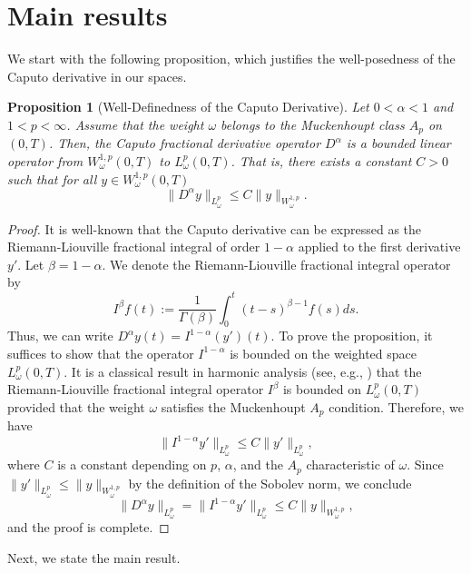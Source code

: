 \documentclass[12pt,a4paper]{article}
\newtheorem{proposition}{Proposition}
\theoremstyle{definition}
\begin{document}
\section{Main results}
We start with the following proposition, which justifies the well-posedness of the Caputo derivative in our spaces. 
\begin{proposition}[Well-Definedness of the Caputo Derivative]
Let $0 < \alpha < 1$ and $1 < p < \infty$. Assume that the weight $\omega$ belongs to the Muckenhoupt class $A_p$ on $(0,T)$. Then, the Caputo fractional derivative operator $D^\alpha$ is a bounded linear operator from $W^{1,p}_\omega(0,T)$ to $L^p_\omega(0,T)$. That is, there exists a constant $C > 0$ such that for all $y \in W^{1,p}_\omega(0,T)$
\begin{equation}
    \| D^\alpha y \|_{L^p_\omega} \leq C \| y \|_{W^{1,p}_\omega}.
\end{equation}
\end{proposition}
\begin{proof}
It is well-known that the Caputo derivative can be expressed as the Riemann-Liouville fractional integral of order $1-\alpha$ applied to the first derivative $y'$. Let $\beta = 1 - \alpha$. We denote the Riemann-Liouville fractional integral operator by 
\begin{equation}
    I^\beta f(t) := \frac{1}{\Gamma(\beta)} \int_0^t (t-s)^{\beta-1} f(s) ds.
\end{equation}
Thus, we can write $D^\alpha y(t) = I^{1-\alpha}(y')(t)$. To prove the proposition, it suffices to show that the operator $I^{1-\alpha}$ is bounded on the weighted space $L^p_\omega(0,T)$. It is a classical result in harmonic analysis (see, e.g., \cite{MuckenhouptWheeden1974}) that the Riemann-Liouville fractional integral operator $I^\beta$ is bounded on $L^p_\omega(0,T)$ provided that the weight $\omega$ satisfies the Muckenhoupt $A_p$ condition. Therefore, we have
\begin{equation}
    \| I^{1-\alpha} y' \|_{L^p_\omega} \leq C \| y' \|_{L^p_\omega},
\end{equation}
where $C$ is a constant depending on $p$, $\alpha$, and the $A_p$ characteristic of $\omega$. Since $\| y' \|_{L^p_\omega} \leq \| y \|_{W^{1,p}_\omega}$ by the definition of the Sobolev norm, we conclude
\begin{equation}
    \| D^\alpha y \|_{L^p_\omega} = \| I^{1-\alpha} y' \|_{L^p_\omega} \leq C \| y \|_{W^{1,p}_\omega},
\end{equation}
and the proof is complete. 
\end{proof}
Next, we state the main result.
\end{document}
